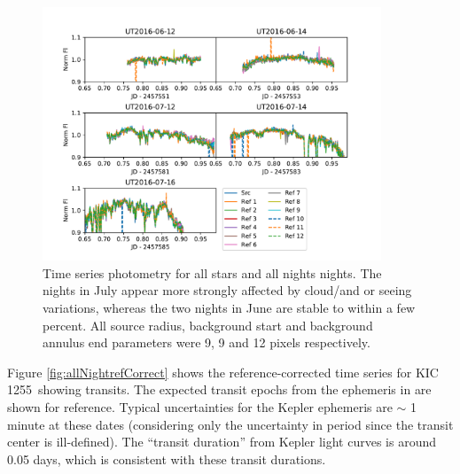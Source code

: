 \documentclass[twocolumn]{aastex61}
\newcommand{\shStar}{KIC 1255}
\begin{document}
\begin{figure}
\begin{centering}
\includegraphics[width=0.9\textwidth]{images/all_kic1255_phot/all_kic1255_allstar.pdf}
\caption{Time series photometry for all stars and all nights nights.
The nights in July appear more strongly affected by cloud/and or seeing variations, whereas the two nights in June are stable to within a few percent.
All source radius, background start and background annulus end parameters were 9, 9 and 12 pixels respectively.}\label{fig:allNightallStar}
\end{centering}
\end{figure}

Figure \ref{fig:allNightrefCorrect} shows the reference-corrected time series for \shStar\ showing transits.
The expected transit epochs from the ephemeris in \citep{vanWerkhoven2014} are shown for reference.
Typical uncertainties for the Kepler ephemeris are $\sim$ 1 minute at these dates (considering only the uncertainty in period since the transit center is ill-defined).
The ``transit duration'' from Kepler light curves is around 0.05 days, which is consistent with these transit durations.
\end{document}
